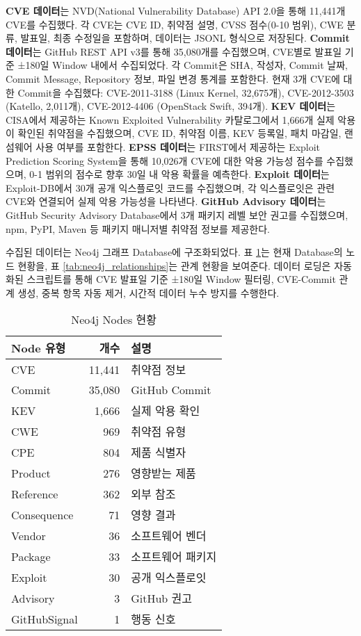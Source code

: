 ﻿\documentclass[conference]{IEEEtran}
\begin{document}
\textbf{CVE 데이터}는 NVD(National Vulnerability Database) API 2.0을 통해 11,441개 CVE를 수집했다. 각 CVE는 CVE ID, 취약점 설명, CVSS 점수(0-10 범위), CWE 분류, 발표일, 최종 수정일을 포함하며, 데이터는 JSONL 형식으로 저장된다. \textbf{Commit 데이터}는 GitHub REST API v3를 통해 35,080개를 수집했으며, CVE별로 발표일 기준 ±180일 Window 내에서 수집되었다. 각 Commit은 SHA, 작성자, Commit 날짜, Commit Message, Repository 정보, 파일 변경 통계를 포함한다. 현재 3개 CVE에 대한 Commit을 수집했다: CVE-2011-3188 (Linux Kernel, 32,675개), CVE-2012-3503 (Katello, 2,011개), CVE-2012-4406 (OpenStack Swift, 394개). \textbf{KEV 데이터}는 CISA에서 제공하는 Known Exploited Vulnerability 카탈로그에서 1,666개 실제 악용이 확인된 취약점을 수집했으며, CVE ID, 취약점 이름, KEV 등록일, 패치 마감일, 랜섬웨어 사용 여부를 포함한다. \textbf{EPSS 데이터}는 FIRST에서 제공하는 Exploit Prediction Scoring System을 통해 10,026개 CVE에 대한 악용 가능성 점수를 수집했으며, 0-1 범위의 점수로 향후 30일 내 악용 확률을 예측한다. \textbf{Exploit 데이터}는 Exploit-DB에서 30개 공개 익스플로잇 코드를 수집했으며, 각 익스플로잇은 관련 CVE와 연결되어 실제 악용 가능성을 나타낸다. \textbf{GitHub Advisory 데이터}는 GitHub Security Advisory Database에서 3개 패키지 레벨 보안 권고를 수집했으며, npm, PyPI, Maven 등 패키지 매니저별 취약점 정보를 제공한다.

수집된 데이터는 Neo4j 그래프 Database에 구조화되었다. 표 \ref{tab:neo4j_nodes}는 현재 Database의 노드 현황을, 표 \ref{tab:neo4j_relationships}는 관계 현황을 보여준다. 데이터 로딩은 자동화된 스크립트를 통해 CVE 발표일 기준 ±180일 Window 필터링, CVE-Commit 관계 생성, 중복 항목 자동 제거, 시간적 데이터 누수 방지를 수행한다.


\begin{table}[h]
\centering
\caption{Neo4j Nodes 현황}
\label{tab:neo4j_nodes}
\begin{tabular}{lrl}
\toprule
\textbf{Node 유형} & \textbf{개수} & \textbf{설명} \\
\midrule
CVE & 11,441 & 취약점 정보 \\
Commit & 35,080 & GitHub Commit \\
KEV & 1,666 & 실제 악용 확인 \\
CWE & 969 & 취약점 유형 \\
CPE & 804 & 제품 식별자 \\
Product & 276 & 영향받는 제품 \\
Reference & 362 & 외부 참조 \\
Consequence & 71 & 영향 결과 \\
Vendor & 36 & 소프트웨어 벤더 \\
Package & 33 & 소프트웨어 패키지 \\
Exploit & 30 & 공개 익스플로잇 \\
Advisory & 3 & GitHub 권고 \\
GitHubSignal & 1 & 행동 신호 \\
\bottomrule
\end{tabular}
\end{table}
\end{document}
